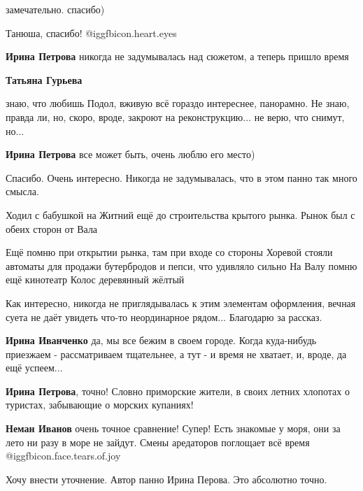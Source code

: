 \begin{itemize}
замечательно. спасибо)

\begin{itemize} %
Танюша, спасибо! @igg{fbicon.heart.eyes} 

\textbf{Ирина Петрова} никогда не задумывалась над сюжетом, а теперь пришло время

\textbf{Татьяна Гурьева} 

знаю, что любишь Подол, вживую всё гораздо интереснее, панорамно. Не знаю,
правда ли, но, скоро, вроде, закроют на реконструкцию... не верю, что снимут,
но...


\textbf{Ирина Петрова} все может быть, очень люблю его место)
\end{itemize} %

Спасибо. Очень интересно. Никогда не задумывалась, что в этом панно так много смысла.


Ходил с бабушкой на Житний ещё до строительства крытого рынка. Рынок был с
обеих сторон от Вала

Ещё помню при открытии рынка, там при входе со стороны Хоревой стояли автоматы
для продажи бутербродов и пепси, что удивляло сильно На Валу помню ещё кинотеатр
Колос деревянный жёлтый


Как интересно, никогда не приглядывалась к этим элементам оформления, вечная
суета не даёт увидеть что-то неординарное рядом... Благодарю за рассказ.

\begin{itemize} %
\textbf{Ирина Иванченко} да, мы все бежим в своем городе. Когда куда-нибудь приезжаем - рассматриваем тщательнее, а тут - и время не хватает, и, вроде, да ещё успеем...

\textbf{Ирина Петрова}, точно!
Словно приморские жители, в своих летних хлопотах о туристах, забывающие о морских купаниях!

\textbf{Неман Иванов} очень точное сравнение! Супер! Есть знакомые у моря, они за лето ни разу в море не зайдут. Смены аредаторов поглощает всё время @igg{fbicon.face.tears.of.joy} 
\end{itemize} %

Хочу внести уточнение. Автор панно Ирина Перова. Это абсолютно точно.


\end{itemize}
